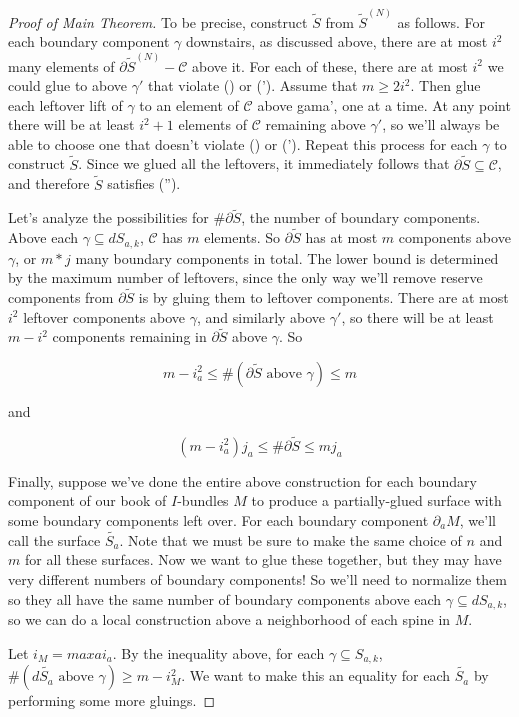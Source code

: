 \documentclass[12pt]{amsart}
\theoremstyle{definition}
\theoremstyle{remark}
\newcommand{\bd}{\partial}
\newcommand{\cin}{\subseteq}
\newcommand{\cC}{\mathcal{C}}
\begin{document}
\begin{proof}[Proof of Main Theorem]
To be precise, construct $\widetilde{S}$ from $\widetilde{S}^{(N)}$ as follows.
For each boundary component $\gamma$ downstairs, as discussed above, there are
at most $i^2$ many elements of $\bd\widetilde{S}^{(N)}-\cC$ above it. For each of
these, there are at most $i^2$ we could glue to above $\gamma'$ that violate
(\dag) or (\dag').  Assume that $m\geq 2i^2$.  Then glue each leftover lift of
$\gamma$ to an element of $\cC$ above gama', one at a time. At any point there
will be at least $i^2+1$ elements of $\cC$ remaining above $\gamma'$, so we'll
always be able to choose one that doesn't violate (\dag) or (\dag'). Repeat
this process for each $\gamma$ to construct $\widetilde{S}$.  Since we glued
all the leftovers, it immediately follows that $\bd\widetilde{S} \cin \cC$, and
therefore $\widetilde{S}$ satisfies (\dag'').

Let's analyze the possibilities for $\#\bd\widetilde{S}$, the number of
boundary components. Above each $\gamma \cin dS_{a,k}$,
$\cC$ has $m$ elements. So $\bd\widetilde{S}$ has at most $m$ components above
$\gamma$, or $m*j$ many boundary components in total. The lower bound is
determined by the maximum number of leftovers, since the only way we'll remove
reserve components from $\bd\widetilde{S}$ is by gluing them to leftover
components. There are at most $i^2$ leftover components above $\gamma$, and
similarly above $\gamma'$, so there will be at least $m - i^2$ components
remaining in $\bd\widetilde{S}$ above $\gamma$. So

\[ m-i_a^2 \leq \#(\bd\widetilde{S} \text{ above }\gamma) \leq m \]

and

\[ (m-i_a^2)j_a \leq \#\bd\widetilde{S} \leq mj_a \]

Finally, suppose we've done the entire above construction for each boundary
component of our book of $I$-bundles $M$ to produce a partially-glued surface
with some boundary components left over. For each boundary component $\bd_aM$,
we'll call the surface $\widetilde{S_a}$. Note that we must be sure to make the same
choice of $n$ and $m$ for all these surfaces. Now we want to glue these
together, but they may have very different numbers of boundary components! So
we'll need to normalize them so they all have the same number of boundary
components above each $\gamma \cin dS_{a,k}$, so we can do a local construction
above a neighborhood of each spine in $M$.

Let $i_M = max a i_a$. By the inequality above, for each $\gamma \cin S_{a,k}$,
$\#(d\widetilde{S_a} \text{ above } \gamma) \geq m - i_M^2$. We want to make
this an equality for each $\widetilde{S_a}$ by performing some more gluings.


\end{proof}
\end{document}
